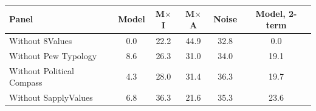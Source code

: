 \begin{tabular}{lccccc}
\toprule
Panel & Model & M$\times$I & M$\times$A & Noise & Model, 2-term \\
\midrule
Without 8Values & 0.0 & 22.2 & 44.9 & 32.8 & 0.0 \\
Without Pew Typology & 8.6 & 26.3 & 31.0 & 34.0 & 19.1 \\
Without Political Compass & 4.3 & 28.0 & 31.4 & 36.3 & 19.7 \\
Without SapplyValues & 6.8 & 36.3 & 21.6 & 35.3 & 23.6 \\
\bottomrule
\end{tabular}

